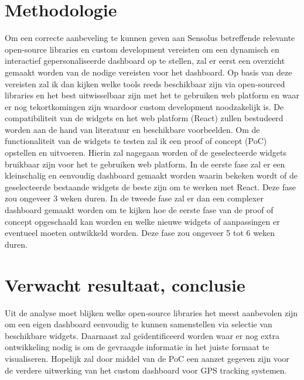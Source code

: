 \documentclass{hogent-article}
\begin{document}
    \section{Methodologie}%
    \label{sec:methodologie}
    
    Om een correcte aanbeveling te kunnen geven aan Sensolus betreffende relevante open-source libraries en custom development vereisten om een dynamisch en interactief gepersonaliseerde dashboard op te stellen, zal er eerst een overzicht gemaakt worden van de nodige vereisten voor het dashboard.
    Op basis van deze vereisten zal ik dan kijken welke tools reeds beschikbaar zijn via open-sourced libraries en het best uitwisselbaar zijn met het te gebruiken web platform en waar er nog tekortkomingen zijn waardoor custom development noodzakelijk is.
    De compatibiliteit van de widgets en het web platform (React) zullen bestudeerd worden aan de hand van literatuur en beschikbare voorbeelden.
    Om de functionaliteit van de widgets te testen zal ik een proof of concept (PoC) opstellen en uitvoeren.
    Hierin zal nagegaan worden of de geselecteerde widgets bruikbaar zijn voor het te gebruiken web platform.
    In de eerste fase zal er een kleinschalig en eenvoudig dashboard gemaakt worden waarin bekeken wordt of de geselecteerde bestaande widgets de beste zijn om te werken met React. Deze fase zou  ongeveer 3 weken duren.
    In de tweede fase zal er dan een complexer dashboard gemaakt worden om te kijken hoe de eerste fase van de proof of concept opgeschaald kan worden en welke nieuwe widgets of aanpassingen er eventueel moeten ontwikkeld worden. Deze fase zou ongeveer 5 tot 6 weken duren.
    
    
    \section{Verwacht resultaat, conclusie}%
    \label{sec:verwachte_resultaten}
    
    Uit de analyse moet blijken welke open-source libraries het meest aanbevolen zijn om een eigen dashboard eenvoudig te kunnen samenstellen via selectie van beschikbare widgets. 
    Daarnaast zal geïdentificeerd worden waar er nog extra ontwikkeling nodig is om de gevraagde informatie in het juiste formaat te visualiseren.
    Hopelijk zal door middel van de PoC een aanzet gegeven zijn voor de verdere uitwerking van het custom dashboard voor GPS tracking systemen.
    
    \pagebreak
    
    \printbibliography[heading=bibintoc]
    
\end{document}
